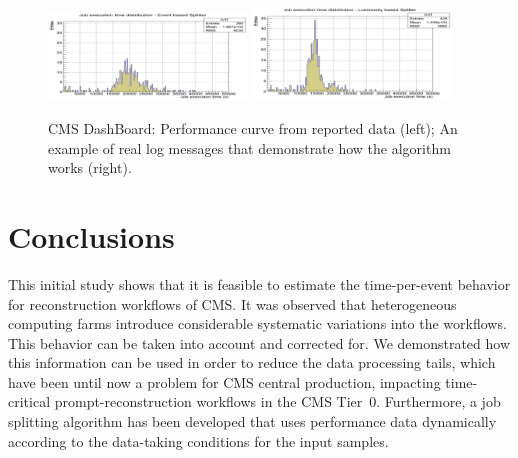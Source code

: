 \documentclass[a4paper]{jpconf}
\begin{document}
\begin{figure}[ht]
  \begin{center}
\includegraphics[width=0.47\textwidth,height=0.47\textwidth]{17.pdf}
\includegraphics[width=0.47\textwidth,height=0.47\textwidth]{18.pdf}
\caption{\label{fig6} CMS DashBoard: Performance curve from reported data (left); An example of real log messages that demonstrate how the algorithm works (right).}
  \end{center}
\vspace{-8mm}
\end{figure}


\section{Conclusions}

This initial study shows that it is feasible to estimate the time-per-event behavior for reconstruction workflows of CMS. It was observed that heterogeneous computing farms introduce considerable systematic variations into the workflows. This behavior can be taken into account and corrected for. We demonstrated how this information can be used in order to reduce the data processing tails, which have been until now a problem for CMS central production, impacting time-critical prompt-reconstruction workflows in the CMS Tier~0. Furthermore, a job splitting algorithm has been developed that uses performance data dynamically according to the data-taking conditions for the input samples.
\end{document}
